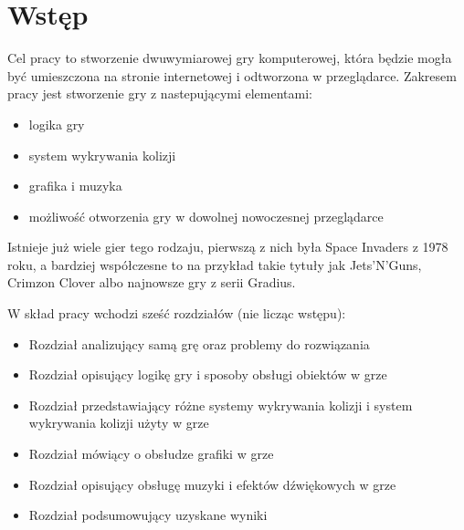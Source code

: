 \chapter{Wstęp}
\thispagestyle{chapterBeginStyle}
\label{ch:intro}

Cel pracy to stworzenie dwuwymiarowej gry komputerowej, która będzie mogła być umieszczona na stronie internetowej i odtworzona w przeglądarce.
Zakresem pracy jest stworzenie gry z nastepującymi elementami:
\begin{itemize}
	\item logika gry
	\item system wykrywania kolizji
	\item grafika i muzyka
	\item możliwo\'sć otworzenia gry w dowolnej nowoczesnej przeglądarce
\end{itemize}

Istnieje już wiele gier tego rodzaju, pierwszą z nich była Space Invaders z 1978 roku, a bardziej współczesne to na przykład takie tytuły jak Jets'N'Guns, Crimzon Clover albo najnowsze gry z serii Gradius.

W skład pracy wchodzi sze\'sć rozdziałów (nie licząc wstępu):
\begin{itemize}
	\item Rozdział analizujący samą grę oraz problemy do rozwiązania
	\item Rozdział opisujący logikę gry i sposoby obsługi obiektów w grze
	\item Rozdział przedstawiający różne systemy wykrywania kolizji i system wykrywania kolizji użyty w grze
	\item Rozdział mówiący o obsłudze grafiki w grze
	\item Rozdział opisujący obsługę muzyki i efektów dźwiękowych w grze
	\item Rozdział podsumowujący uzyskane wyniki
\end{itemize}

\cleardoublepage